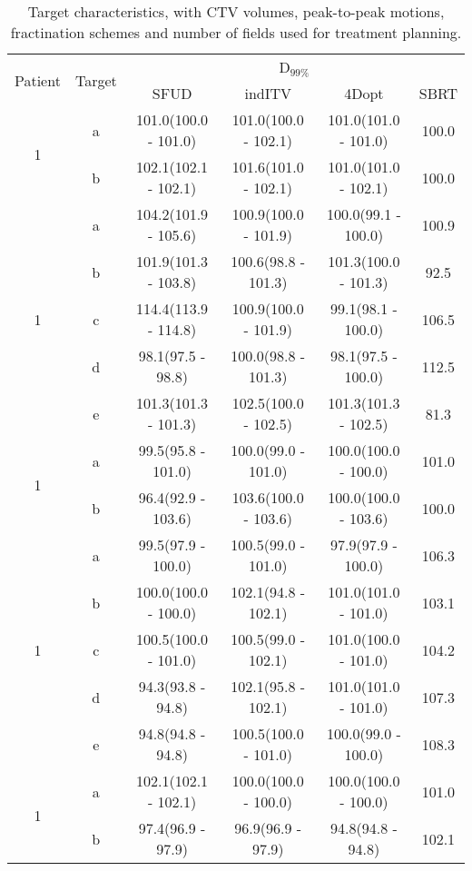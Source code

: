 \begin{table}[H]
	\centering
	\caption{Target characteristics, with CTV volumes, peak-to-peak motions, fractination schemes and number of fields used for treatment planning.}
	\begin{tabular}{c|c|c|c|c|c}
		\hline\hline
		\multirow{2}{*}{Patient} & \multirow{2}{*}{Target} & \multicolumn{4}{|c}{D$_{99\%}$} \\
		 & & SFUD & indITV & 4Dopt & SBRT \\
		\hline
\multirow{2}{*}{1} & a & 101.0(100.0 - 101.0) & 101.0(100.0 - 102.1) & 101.0(101.0 - 101.0) & 100.0\\ 
 & b & 102.1(102.1 - 102.1) & 101.6(101.0 - 102.1) & 101.0(101.0 - 102.1) & 100.0\\ 
\hline

\multirow{5}{*}{1} & a & 104.2(101.9 - 105.6) & 100.9(100.0 - 101.9) & 100.0(99.1 - 100.0) & 100.9\\ 
 & b & 101.9(101.3 - 103.8) & 100.6(98.8 - 101.3) & 101.3(100.0 - 101.3) & 92.5\\ 
 & c & 114.4(113.9 - 114.8) & 100.9(100.0 - 101.9) & 99.1(98.1 - 100.0) & 106.5\\ 
 & d & 98.1(97.5 - 98.8) & 100.0(98.8 - 101.3) & 98.1(97.5 - 100.0) & 112.5\\ 
 & e & 101.3(101.3 - 101.3) & 102.5(100.0 - 102.5) & 101.3(101.3 - 102.5) & 81.3\\ 
\hline

\multirow{2}{*}{1} & a & 99.5(95.8 - 101.0) & 100.0(99.0 - 101.0) & 100.0(100.0 - 100.0) & 101.0\\ 
 & b & 96.4(92.9 - 103.6) & 103.6(100.0 - 103.6) & 100.0(100.0 - 103.6) & 100.0\\ 
\hline

\multirow{5}{*}{1} & a & 99.5(97.9 - 100.0) & 100.5(99.0 - 101.0) & 97.9(97.9 - 100.0) & 106.3\\ 
 & b & 100.0(100.0 - 100.0) & 102.1(94.8 - 102.1) & 101.0(101.0 - 101.0) & 103.1\\ 
 & c & 100.5(100.0 - 101.0) & 100.5(99.0 - 102.1) & 101.0(100.0 - 101.0) & 104.2\\ 
 & d & 94.3(93.8 - 94.8) & 102.1(95.8 - 102.1) & 101.0(101.0 - 101.0) & 107.3\\ 
 & e & 94.8(94.8 - 94.8) & 100.5(100.0 - 101.0) & 100.0(99.0 - 100.0) & 108.3\\ 
\hline

\multirow{2}{*}{1} & a & 102.1(102.1 - 102.1) & 100.0(100.0 - 100.0) & 100.0(100.0 - 100.0) & 101.0\\ 
 & b & 97.4(96.9 - 97.9) & 96.9(96.9 - 97.9) & 94.8(94.8 - 94.8) & 102.1\\ 
\hline


\end{tabular}
\end{table}
